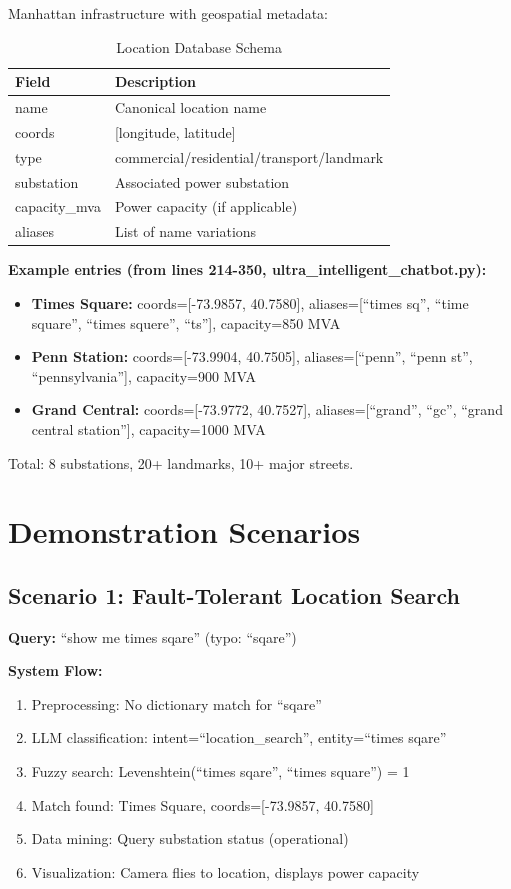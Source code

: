 \documentclass[sigconf]{acmart}
\begin{document}
Manhattan infrastructure with geospatial metadata:

\begin{table}[h]
\centering
\caption{Location Database Schema}
\small
\begin{tabular}{lp{5cm}}
\toprule
\textbf{Field} & \textbf{Description} \\
\midrule
name & Canonical location name \\
coords & [longitude, latitude] \\
type & commercial/residential/transport/landmark \\
substation & Associated power substation \\
capacity\_mva & Power capacity (if applicable) \\
aliases & List of name variations \\
\bottomrule
\end{tabular}
\end{table}

\textbf{Example entries (from lines 214-350, ultra\_intelligent\_chatbot.py):}

\begin{itemize}
    \item \textbf{Times Square:} coords=[-73.9857, 40.7580], aliases=[``times sq'', ``time square'', ``times squere'', ``ts''], capacity=850 MVA
    \item \textbf{Penn Station:} coords=[-73.9904, 40.7505], aliases=[``penn'', ``penn st'', ``pennsylvania''], capacity=900 MVA
    \item \textbf{Grand Central:} coords=[-73.9772, 40.7527], aliases=[``grand'', ``gc'', ``grand central station''], capacity=1000 MVA
\end{itemize}

Total: 8 substations, 20+ landmarks, 10+ major streets.

\section{Demonstration Scenarios}

\subsection{Scenario 1: Fault-Tolerant Location Search}

\textbf{Query:} ``show me times sqare'' (typo: ``sqare'')

\textbf{System Flow:}
\begin{enumerate}
    \item Preprocessing: No dictionary match for ``sqare''
    \item LLM classification: intent=``location\_search'', entity=``times sqare''
    \item Fuzzy search: Levenshtein(``times sqare'', ``times square'') = 1
    \item Match found: Times Square, coords=[-73.9857, 40.7580]
    \item Data mining: Query substation status (operational)
    \item Visualization: Camera flies to location, displays power capacity
\end{enumerate}
\end{document}
